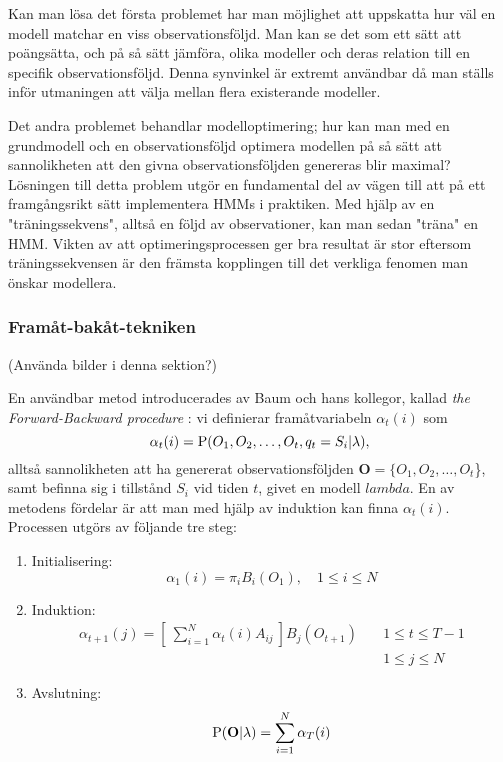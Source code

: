 \documentclass[../rapport_MVEX01-11-05]{subfiles}
\begin{document}
Kan man lösa det första problemet har man möjlighet att uppskatta hur
väl en modell matchar en viss observationsföljd. Man kan se det som
ett sätt att poängsätta, och på så sätt jämföra, olika modeller och
deras relation till en specifik observationsföljd. Denna synvinkel är
extremt användbar då man ställs inför utmaningen att välja mellan
flera existerande modeller. 

Det andra problemet behandlar modelloptimering; hur kan man med en
grundmodell och en observationsföljd optimera modellen på så sätt att
sannolikheten att den givna observationsföljden genereras blir
maximal? Lösningen till detta problem utgör en fundamental del av
vägen till att på ett framgångsrikt sätt implementera HMMs i
praktiken. Med hjälp av en "träningssekvens", alltså en följd av
observationer, kan man sedan "träna" en HMM. Vikten av att
optimeringsprocessen ger bra resultat är stor eftersom
träningssekvensen är den främsta kopplingen till det verkliga fenomen
man önskar modellera.      

\subsubsection{Framåt-bakåt-tekniken}

(Använda bilder i denna sektion?)

En användbar metod introducerades av Baum och hans kollegor, kallad
\emph{the Forward-Backward procedure} \cite{Baum67}: vi
definierar framåtvariabeln $\alpha_t(i)$ som 
\begin{equation*}
\alpha_t(i) = \mathrm{P}(O_1,O_2,\dots,O_t,q_t = S_i | \lambda),
\end{equation*}
alltså sannolikheten att ha genererat observationsföljden $\textbf{O}
= \{O_1,O_2,\dots,O_t$\}, samt befinna sig i tillstånd $S_i$ vid tiden
$t$, givet en modell $lambda$. En av metodens fördelar är att man med
hjälp av induktion kan finna $\alpha_t(i)$. Processen utgörs av
följande tre steg: 

\begin{enumerate}
\item Initialisering:
\begin{equation*}
\alpha_1(i) = \pi_iB_i(O_1), \quad 1\leq i \leq N
\end{equation*}

\item Induktion:
\begin{align*}
\alpha_{t+1}(j) =
\left[~\sum_{i=1}^N\alpha_t(i)A_{ij}~\right]B_j(O_{t+1}) \quad &1 \leq t \leq T-1 \\
&1 \leq j \leq N
\end{align*}

\item Avslutning:
\begin{equation*}
\mathrm{P}(\textbf{O}|\lambda) = \sum_{i=1}^N\alpha_T(i)
\end{equation*}
\end{enumerate}
\end{document}
